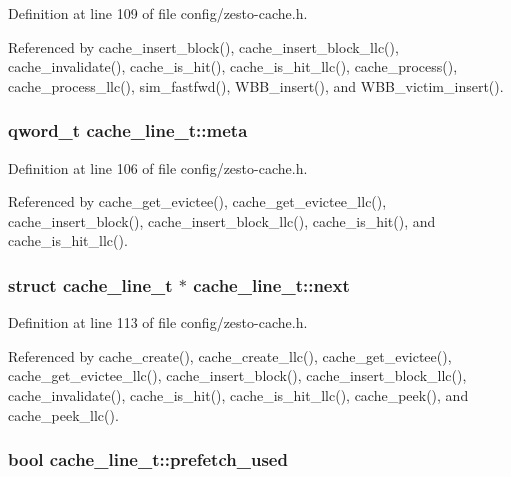 Definition at line 109 of file config/zesto-cache.h.

Referenced by cache\_\-insert\_\-block(), cache\_\-insert\_\-block\_\-llc(), cache\_\-invalidate(), cache\_\-is\_\-hit(), cache\_\-is\_\-hit\_\-llc(), cache\_\-process(), cache\_\-process\_\-llc(), sim\_\-fastfwd(), WBB\_\-insert(), and WBB\_\-victim\_\-insert().
\subsubsection[{meta}]{\setlength{\rightskip}{0pt plus 5cm}qword\_\-t {\bf cache\_\-line\_\-t::meta}}\label{structcache__line__t_b6e01ca73fd0cd40e5adfe70048042a9}




Definition at line 106 of file config/zesto-cache.h.

Referenced by cache\_\-get\_\-evictee(), cache\_\-get\_\-evictee\_\-llc(), cache\_\-insert\_\-block(), cache\_\-insert\_\-block\_\-llc(), cache\_\-is\_\-hit(), and cache\_\-is\_\-hit\_\-llc().
\subsubsection[{next}]{\setlength{\rightskip}{0pt plus 5cm}struct {\bf cache\_\-line\_\-t} $\ast$ {\bf cache\_\-line\_\-t::next}\hspace{0.3cm}{\tt  [read]}}\label{structcache__line__t_7ec2f4a584e3d9b4f19ca987009a0d7b}




Definition at line 113 of file config/zesto-cache.h.

Referenced by cache\_\-create(), cache\_\-create\_\-llc(), cache\_\-get\_\-evictee(), cache\_\-get\_\-evictee\_\-llc(), cache\_\-insert\_\-block(), cache\_\-insert\_\-block\_\-llc(), cache\_\-invalidate(), cache\_\-is\_\-hit(), cache\_\-is\_\-hit\_\-llc(), cache\_\-peek(), and cache\_\-peek\_\-llc().
\subsubsection[{prefetch\_\-used}]{\setlength{\rightskip}{0pt plus 5cm}bool {\bf cache\_\-line\_\-t::prefetch\_\-used}}\label{structcache__line__t_d83c4ef3a6b85abf90339b3fd0062e0e}




